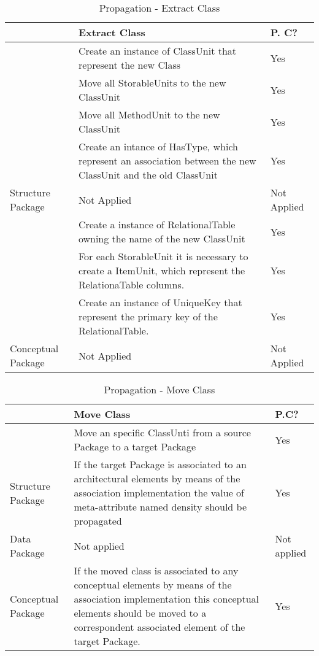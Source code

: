 \begin{table}
\caption{Propagation - Extract Class}
\label{table:propagationExtractClass}
{\footnotesize{}}%
\setlength{\tabcolsep}{0.0em}
{\renewcommand{\arraystretch}{0.5}
\begin{tabular}{|>{\centering}p{2cm}|>{\raggedright}m{5cm}|>{\centering}p{}|}
\hline 
{\footnotesize{Refactoring}} & {\footnotesize{Extract Class}} & {\footnotesize{P. C?}}\tabularnewline
\hline 
\hline 
\multirow{4}{2cm}{{\footnotesize{Code Package}}} & {\footnotesize{Create an instance of ClassUnit that represent the
new Class}} & {\footnotesize{Yes}}\tabularnewline
\cline{2-3} 
 & {\footnotesize{Move all StorableUnits to the new ClassUnit}} & {\footnotesize{Yes}}\tabularnewline
\cline{2-3} 
 & {\footnotesize{Move all MethodUnit to the new ClassUnit}} & {\footnotesize{Yes}}\tabularnewline
\cline{2-3} 
 & {\footnotesize{Create an intance of HasType, which represent an association
between the new ClassUnit and the old ClassUnit}} & {\footnotesize{Yes}}\tabularnewline
\hline 
{\footnotesize{Structure Package}} & {\footnotesize{Not Applied}} & {\footnotesize{Not Applied}}\tabularnewline
\hline 
\multirow{3}{2cm}{{\footnotesize{Data Package}}} & {\footnotesize{Create a instance of RelationalTable owning the name
of the new ClassUnit}} & {\footnotesize{Yes}}\tabularnewline
\cline{2-3} 
 & {\footnotesize{For each StorableUnit it is necessary to create a ItemUnit,
which represent the RelationaTable columns.}} & {\footnotesize{Yes}}\tabularnewline
\cline{2-3} 
 & {\footnotesize{Create an instance of UniqueKey that represent the
primary key of the RelationalTable.}} & {\footnotesize{Yes}}\tabularnewline
\hline 
{\footnotesize{Conceptual Package}} & {\footnotesize{Not Applied}} & {\footnotesize{Not Applied}}\tabularnewline
\hline 
\end{tabular}}
\end{table}
\begin{table}
\caption{Propagation - Move Class}
{\footnotesize{}}%
\setlength{\tabcolsep}{0.0em}
{\renewcommand{\arraystretch}{0.5}
\begin{tabular}{|>{\centering}p{2cm}|>{\raggedright}p{5cm}|>{\centering}p{}|}
\hline 
{\footnotesize{Refactoring}} & {\footnotesize{Move Class}} & {\footnotesize{P.C?}}\tabularnewline
\hline 
\hline 
{\footnotesize{Code Package}} & {\footnotesize{Move an specific ClassUnti from a source Package to
a target Package}} & {\footnotesize{Yes}}\tabularnewline
\hline 
{\footnotesize{Structure Package}} & {\footnotesize{If the target Package is associated to an architectural
elements by means of the association implementation the value of meta-attribute
named density should be propagated }} & {\footnotesize{Yes}}\tabularnewline
\hline 
{\footnotesize{Data Package}} & {\footnotesize{Not applied}} & {\footnotesize{Not applied}}\tabularnewline
\hline 
{\footnotesize{Conceptual Package}} & {\footnotesize{If the moved class is associated to any conceptual
elements by means of the association implementation this conceptual
elements should be moved to a correspondent associated element of
the target Package. }} & {\footnotesize{Yes}}\tabularnewline
\hline 
\end{tabular}}
\end{table}
